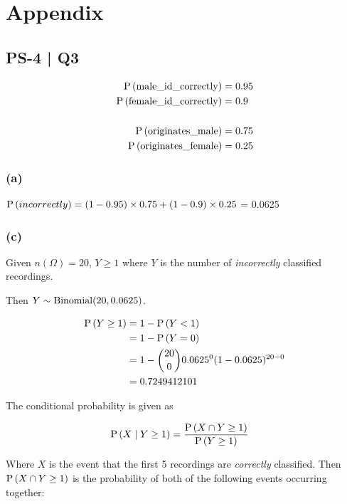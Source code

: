 \section{Appendix}

\subsection{PS-4 | Q3}

\begin{align}
    \mathrm{P} \left( \mathrm{male\_id\_correctly} \right) &= 0.95 \\
    \mathrm{P} \left( \mathrm{female\_id\_correctly} \right) &= 0.9 \\
    \nonumber \\
    \mathrm{P} \left( \mathrm{originates\_male} \right) &= 0.75 \\
    \mathrm{P} \left( \mathrm{originates\_female} \right) &= 0.25
\end{align}

\subsubsection{(a)}

$\mathrm{P} \left( incorrectly \right) = (1 - 0.95) \times 0.75 + (1 - 0.9) \times 0.25$ = 0.0625

\subsubsection{(c)}

Given $n(\Omega) = 20$, $Y \ge 1$ where $Y$ is the number of \textit{incorrectly} classified recordings.

Then $Y \sim \mathrm{Binomial}(20, 0.0625)$.

\begin{align}
    \mathrm{P} \left( Y \ge 1 \right)
    &= 1 - \mathrm{P} \left( Y < 1 \right) \\
    &= 1 - \mathrm{P} \left( Y = 0 \right) \\
    &= 1 - \binom{20}{0} 0.0625^{0} (1 - 0.0625)^{20 - 0} \\
    &= 0.7249412101
\end{align}

The conditional probability is given as

\begin{align}
    \mathrm{P} \left( X \mid Y \ge 1 \right)
        &= \frac{ \mathrm{P} \left( X \cap Y \ge 1 \right) }{ \mathrm{P} \left( Y \ge 1 \right) }
\end{align}

Where $X$ is the event that the first 5 recordings are \textit{correctly} classified. Then $\mathrm{P} \left( X \cap Y \ge 1 \right)$ is the probability of both of the following events occurring together:

